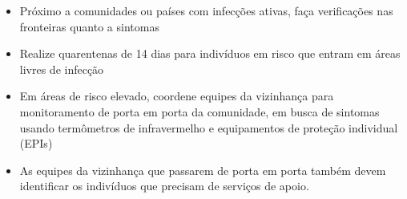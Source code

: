 \documentclass[onecolumn,journal]{IEEEtran}
\begin{document}
\begin{multicols}{2}
\begin{itemize}
\item Próximo a comunidades ou países com infecções ativas, faça verificações nas fronteiras quanto a sintomas
\item Realize quarentenas de 14 dias para indivíduos em risco que entram em áreas livres de infecção
\item Em áreas de risco elevado, coordene equipes da vizinhança para monitoramento de porta em porta da comunidade, em busca de sintomas usando termômetros de infravermelho e equipamentos de proteção individual (EPIs)
\item As equipes da vizinhança que passarem de porta em porta também devem identificar os indivíduos que precisam de serviços de apoio.

\end{itemize}

\vspace{2ex}


\end{multicols}
\end{document}

